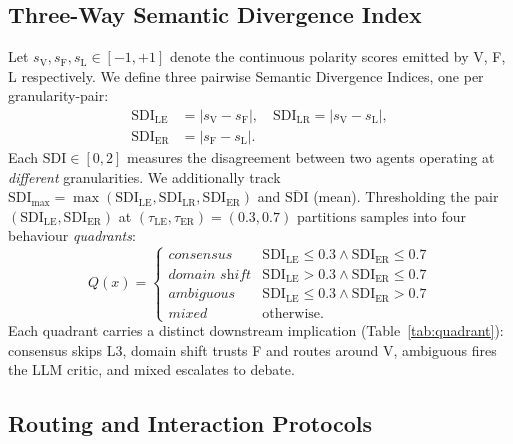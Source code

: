 \subsection{Three-Way Semantic Divergence Index}
\label{sec:framework:sdi}

Let $s_{\mathrm{V}}, s_{\mathrm{F}}, s_{\mathrm{L}} \in [-1, +1]$
denote the continuous polarity scores emitted by V, F, L
respectively. We define three pairwise Semantic Divergence Indices,
one per granularity-pair:
\begin{equation}
\label{eq:sdi}
\begin{aligned}
\mathrm{SDI}_{\mathrm{LE}} &= |s_{\mathrm{V}} - s_{\mathrm{F}}|,
\quad
\mathrm{SDI}_{\mathrm{LR}}  = |s_{\mathrm{V}} - s_{\mathrm{L}}|,\\
\mathrm{SDI}_{\mathrm{ER}} &= |s_{\mathrm{F}} - s_{\mathrm{L}}|.
\end{aligned}
\end{equation}
Each $\mathrm{SDI}\in [0,2]$ measures the disagreement between two
agents operating at \emph{different} granularities. We additionally
track $\mathrm{SDI}_{\max}=\max(\mathrm{SDI}_{\mathrm{LE}},
\mathrm{SDI}_{\mathrm{LR}},\mathrm{SDI}_{\mathrm{ER}})$ and
$\overline{\mathrm{SDI}}$ (mean). Thresholding the pair
$(\mathrm{SDI}_{\mathrm{LE}},\mathrm{SDI}_{\mathrm{ER}})$ at
$(\tau_{\mathrm{LE}},\tau_{\mathrm{ER}})=(0.3,0.7)$ partitions
samples into four behaviour \emph{quadrants}:
\begin{equation}
\label{eq:quadrant}
Q(x) = \begin{cases}
\textit{consensus}     & \mathrm{SDI}_{\mathrm{LE}} \le 0.3 \land \mathrm{SDI}_{\mathrm{ER}} \le 0.7 \\
\textit{domain shift}  & \mathrm{SDI}_{\mathrm{LE}} >    0.3 \land \mathrm{SDI}_{\mathrm{ER}} \le 0.7 \\
\textit{ambiguous}     & \mathrm{SDI}_{\mathrm{LE}} \le 0.3 \land \mathrm{SDI}_{\mathrm{ER}} >    0.7 \\
\textit{mixed}         & \text{otherwise}.
\end{cases}
\end{equation}
Each quadrant carries a distinct downstream implication
(Table~\ref{tab:quadrant}): consensus skips L3, domain shift trusts
F and routes around V, ambiguous fires the LLM critic, and mixed
escalates to debate.

\subsection{Routing and Interaction Protocols}
\label{sec:framework:routing}

